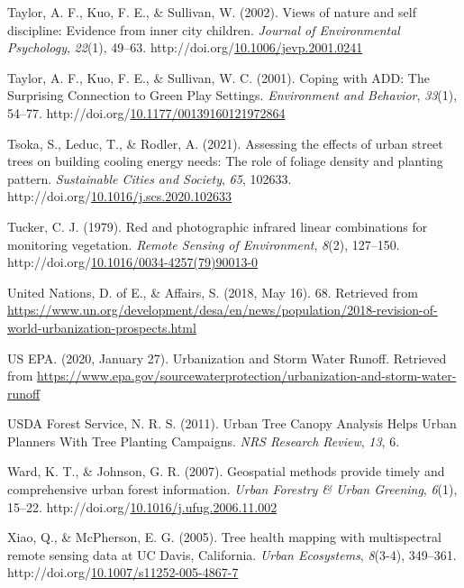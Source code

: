 \documentclass[12pt,twoside]{reedthesis}
\newlength{\cslhangindent}
\newenvironment{CSLReferences}[2] %
 {%
  \setlength{\parindent}{0pt}
  \ifodd #1 \everypar{\setlength{\hangindent}{\cslhangindent}}\ignorespaces\fi
  \ifnum #2 > 0
  \setlength{\parskip}{#2\baselineskip}
  \fi
 }%
 {}
\begin{document}
\begin{CSLReferences}{1}{0}
\leavevmode{}%
Taylor, A. F., Kuo, F. E., \& Sullivan, W. (2002). Views of nature and self discipline: Evidence from inner city children. \emph{Journal of Environmental Psychology}, \emph{22}(1), 49--63. http://doi.org/\href{https://doi.org/10.1006/jevp.2001.0241}{10.1006/jevp.2001.0241}

\leavevmode{}%
Taylor, A. F., Kuo, F. E., \& Sullivan, W. C. (2001). Coping with ADD: The Surprising Connection to Green Play Settings. \emph{Environment and Behavior}, \emph{33}(1), 54--77. http://doi.org/\href{https://doi.org/10.1177/00139160121972864}{10.1177/00139160121972864}

\leavevmode{}%
Tsoka, S., Leduc, T., \& Rodler, A. (2021). Assessing the effects of urban street trees on building cooling energy needs: The role of foliage density and planting pattern. \emph{Sustainable Cities and Society}, \emph{65}, 102633. http://doi.org/\href{https://doi.org/10.1016/j.scs.2020.102633}{10.1016/j.scs.2020.102633}

\leavevmode{}%
Tucker, C. J. (1979). Red and photographic infrared linear combinations for monitoring vegetation. \emph{Remote Sensing of Environment}, \emph{8}(2), 127--150. http://doi.org/\href{https://doi.org/10.1016/0034-4257(79)90013-0}{10.1016/0034-4257(79)90013-0}

\leavevmode{}%
United Nations, D. of E., \& Affairs, S. (2018, May 16). 68. Retrieved from \url{https://www.un.org/development/desa/en/news/population/2018-revision-of-world-urbanization-prospects.html}

\leavevmode{}%
US EPA. (2020, January 27). Urbanization and Storm Water Runoff. Retrieved from \url{https://www.epa.gov/sourcewaterprotection/urbanization-and-storm-water-runoff}

\leavevmode{}%
USDA Forest Service, N. R. S. (2011). Urban Tree Canopy Analysis Helps Urban Planners With Tree Planting Campaigns. \emph{NRS Research Review}, \emph{13}, 6.

\leavevmode{}%
Ward, K. T., \& Johnson, G. R. (2007). Geospatial methods provide timely and comprehensive urban forest information. \emph{Urban Forestry \& Urban Greening}, \emph{6}(1), 15--22. http://doi.org/\href{https://doi.org/10.1016/j.ufug.2006.11.002}{10.1016/j.ufug.2006.11.002}

\leavevmode{}%
Xiao, Q., \& McPherson, E. G. (2005). Tree health mapping with multispectral remote sensing data at UC Davis, California. \emph{Urban Ecosystems}, \emph{8}(3-4), 349--361. http://doi.org/\href{https://doi.org/10.1007/s11252-005-4867-7}{10.1007/s11252-005-4867-7}

\end{CSLReferences}

\end{document}
